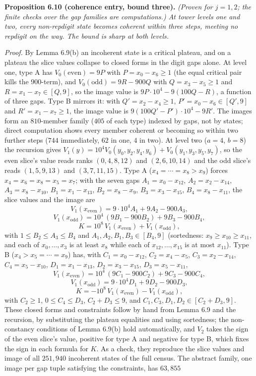 \documentclass[11pt,letterpaper]{article}
\theoremstyle{paperstyle}
\theoremstyle{paperstyledef}
\theoremstyle{paperstylerem}
\begin{document}
\textbf{Proposition 6.10 (coherence entry, bound three).} \emph{(Proven for \(j = 1, 2\); the finite checks over the gap families are computations.) At tower levels one and two, every non-repdigit state becomes coherent within three steps, meeting no repdigit on the way. The bound is sharp at both levels.}

\emph{Proof.} By Lemma 6.9(b) an incoherent state is a critical plateau, and on a plateau the slice values collapse to closed forms in the digit gaps alone. At level one, type A has \(V_0(\mathrm{even}) = 9P\) with \(P = x_0 - x_6 \geq 1\) (the equal critical pair kills the \(900\)-term), and \(V_0(\mathrm{odd}) = 9R - 900Q\) with \(Q = x_3 - x_5 \geq 1\) and \(R = x_1 - x_7 \in [Q, 9]\), so the image value is \(9P \cdot 10^4 - 9(100Q - R)\), a function of three gaps. Type B mirrors it: with \(Q' = x_2 - x_4 \geq 1\), \(P' = x_0 - x_6 \in [Q', 9]\) and \(R' = x_1 - x_7 \geq 1\), the image value is \(9(100Q' - P') \cdot 10^4 - 9R'\). The images form an \(810\)-member family (\(405\) of each type) indexed by gaps, not by states; direct computation shows every member coherent or becoming so within two further steps (\(744\) immediately, \(62\) in one, \(4\) in two). At level two (\(a = 4\), \(b = 8\)) the recursion gives \(V_1(y) = 10^4 V_0(y_0, y_2, y_4, y_6) + V_0(y_1, y_3, y_5, y_7)\), so the even slice's value reads ranks \((0, 4, 8, 12)\) and \((2, 6, 10, 14)\) and the odd slice's reads \((1, 5, 9, 13)\) and \((3, 7, 11, 15)\). Type A (\(x_4 = \cdots = x_8 > x_9\)) forces \(x_4 = x_6 = x_8 = x_5 = x_7\); with the seven gaps \(A_1 = x_0 - x_{12}\), \(A_2 = x_2 - x_{14}\), \(A_3 = x_8 - x_{10}\), \(B_1 = x_1 - x_{13}\), \(B_2 = x_8 - x_9\), \(B_3 = x_3 - x_{15}\), \(B_4 = x_8 - x_{11}\), the slice values and the image are \[V_1(x_{\mathrm{even}}) = 9 \cdot 10^4 A_1 + 9A_2 - 900A_3,\] \[V_1(x_{\mathrm{odd}}) = 10^4\,(9B_1 - 900B_2) + 9B_3 - 900B_4,\] \[K = 10^8\, V_1(x_{\mathrm{even}}) + V_1(x_{\mathrm{odd}}),\] with \(1 \leq B_2 \leq A_3 \leq B_4\) and \(A_1, A_2, B_1, B_3 \in [B_4, 9]\) (sortedness: \(x_9 \geq x_{10} \geq x_{11}\), and each of \(x_0, \dots, x_3\) is at least \(x_8\) while each of \(x_{12}, \dots, x_{15}\) is at most \(x_{11}\)). Type B (\(x_4 > x_5 = \cdots = x_9\)) has, with \(C_1 = x_0 - x_{12}\), \(C_2 = x_4 - x_5\), \(C_3 = x_2 - x_{14}\), \(C_4 = x_5 - x_{10}\), \(D_1 = x_1 - x_{13}\), \(D_2 = x_3 - x_{15}\), \(D_3 = x_5 - x_{11}\), \[V_1(x_{\mathrm{even}}) = 10^4\,(9C_1 - 900C_2) + 9C_3 - 900C_4,\] \[V_1(x_{\mathrm{odd}}) = 9 \cdot 10^4 D_1 + 9D_2 - 900D_3,\] \[K = -10^8\, V_1(x_{\mathrm{even}}) - V_1(x_{\mathrm{odd}}),\] with \(C_2 \geq 1\), \(0 \leq C_4 \leq D_3\), \(C_2 + D_3 \leq 9\), and \(C_1, C_3, D_1, D_2 \in [C_2 + D_3, 9]\). These closed forms and constraints follow by hand from Lemma 6.9 and the recursion, by substituting the plateau equalities and using sortedness; the non-constancy conditions of Lemma 6.9(b) hold automatically, and \(V_2\) takes the sign of the even slice's value, positive for type A and negative for type B, which fixes the sign in each formula for \(K\). As a check, they reproduce the slice values and image of all \(251{,}940\) incoherent states of the full census. The abstract family, one image per gap tuple satisfying the constraints, has \(63{,}855\) 
\end{document}
